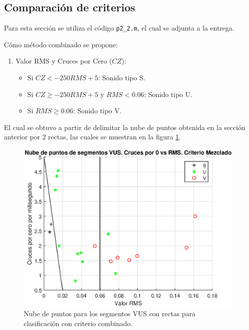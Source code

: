\subsection{Comparación de criterios}

Para esta sección se utiliza el código \texttt{p2\_2.m}, el cual se adjunta a la entrega.

Cómo método combinado se propone:
\begin{enumerate}
    \item Valor RMS y Cruces por Cero ($CZ$):
    \begin{itemize}
        \item Si $CZ < -250RMS + 5$: Sonido tipo S.
        \item Si $CZ \geq -250RMS + 5$ y $RMS < 0.06$: Sonido tipo U.
        \item Si $RMS \geq 0.06$: Sonido tipo V.
    \end{itemize}
\end{enumerate}
El cual se obtuvo a partir de delimitar la nube de puntos obtenida en la sección anterior por 2 rectas, las cuales se muestran en la figura \ref{fig:p2_2nube}.

\begin{figure}[H]
    \centering
    \includegraphics[width = .8\linewidth]{figures/p2_2nube.eps}
    \caption{Nube de puntos para los segmentos VUS con rectas para clasificación con criterio combinado.}
    \label{fig:p2_2nube}
\end{figure}

